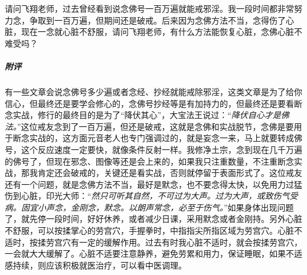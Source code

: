 \begin{case}
    请问飞翔老师，过去曾经看到说念佛号一百万遍就能戒邪淫。我一段时间都非常努力念，争取到一百万遍，但期间还是破戒。后来因为念佛方法不当，念得伤了心脏，现在一念就心脏不舒服，请问飞翔老师，有什么方法能恢复心脏，念佛心脏不难受吗？
    \subparagraph{附评} 有一些文章会说念佛号多少遍或者念经、抄经就能戒除邪淫，这类文章是为了给你信心，但最终还是要学会修心的，念佛号抄经等是有加持力的，但最终还是要看断念实战，修行的最终目的是为了“降伏其心”，大宝法王说过：“\textit{降伏自心才是佛法。}”这位戒友念到了一百万遍，但还是破戒，这就是念佛和实战脱节，念佛是要用于断念实战的，这方面元音老人也专门强调过的，就是妄念一来，马上就要转成佛号，这个反应速度一定要快，就像条件反射一样。我修净土宗，念到现在几千万遍的佛号了，但现在邪念、图像等还是会上来的，如果我只注重数量，不注重断念实战，那我肯定还会破戒的，关键还是看实战，否则就停留于表面形式了。这位戒友还有一个问题，就是念佛方法不当，最好是默念，也不要念得太快，以免用力过猛伤到心脏，印光大师：“\textit{然只可听其自然，不可过为大声。过为大声，或致伤气受病。固宜小声念，金刚念，默念。以朗声常念，必至于伤气。}”如果身体出现问题了，就先停一段时间，好好休养，或者减少日课，采用默念或者金刚持。另外心脏不舒服，可以按揉掌心的劳宫穴，手握拳时，中指指尖所指区域为劳宫穴。心脏不适时，按揉劳宫穴有一定的缓解作用。过去有时我心脏不适时，就会按揉劳宫穴，一会就大大缓解了。心脏不适要注意静养，避免劳累和用力，保证睡眠，如果不适感持续，则应该积极就医治疗，可以看中医调理。
\end{case}


